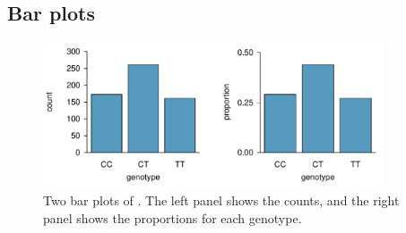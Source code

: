 \subsection{Bar plots}
\begin{figure}[h!]
	\centering
	\includegraphics[width=0.9\textwidth]{ch_intro_to_data_oi_biostat/figures/famussBarPlot/famussBarPlot}
	\caption{Two bar plots of . The left panel shows the counts, and the right panel shows the proportions for each genotype.}
	\label{famussBarPlot}
\end{figure}

